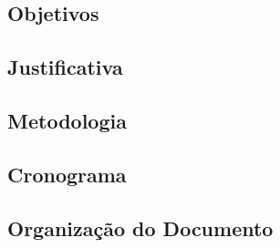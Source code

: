 \subsection{Objetivos} \label{subsec:objetivos}


\subsection{Justificativa} \label{subsec:jutificativa}


\subsection{Metodologia} \label{subsec:metodologia}


\subsection{Cronograma} \label{subsec:cronograma}


\subsection{Organização do Documento} \label{subsec:organizacao}

